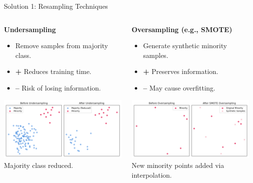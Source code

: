 \documentclass[serif, aspectratio=169]{beamer}
\begin{document}
\begin{frame}{Solution 1: Resampling Techniques}
    \begin{columns}[T]
        \begin{column}{0.48\textwidth}
            \textbf{Undersampling}
            \begin{itemize}\itemsep0.8em
                \item Remove samples from majority class.
                \item \textbf{+} Reduces training time.
                \item \textbf{--} Risk of losing information.
            \end{itemize}
            \vspace{0.8em}
            \includegraphics[width=\textwidth]{pic/Figure_33.png}\\
            \scriptsize Majority class reduced.
        \end{column}

        \begin{column}{0.48\textwidth}
            \textbf{Oversampling (e.g., SMOTE)}
            \begin{itemize}\itemsep0.8em
                \item Generate synthetic minority samples.
                \item \textbf{+} Preserves information.
                \item \textbf{--} May cause overfitting.
            \end{itemize}
            \vspace{0.8em}
            \includegraphics[width=\textwidth]{pic/Figure_34.png}\\
            \scriptsize New minority points added via interpolation.
        \end{column}
    \end{columns}
\end{frame}
\end{document}

